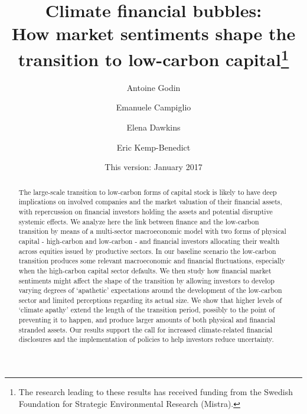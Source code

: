 \documentclass[authoryear]{article}
\begin{document}
 

\title{Climate financial bubbles: \\How market sentiments shape the transition to low-carbon capital\footnote{The research leading to these results has received funding from the Swedish Foundation for Strategic Environmental Research (Mistra).}}
\author[1]{Antoine Godin}
\author[2]{Emanuele Campiglio}
\author[3]{Elena Dawkins}
\author[3]{Eric Kemp-Benedict}
\renewcommand\Authands{ and }

\date{This version: January 2017}

\maketitle

\vspace{-0.7cm}
\begin{abstract}
The large-scale transition to low-carbon forms of capital stock is likely to have deep implications on involved companies and the market valuation of their financial assets, with repercussion on financial investors holding the assets and potential disruptive systemic effects. We analyze here the link between finance and the low-carbon transition by means of a multi-sector macroeconomic model with two forms of physical capital - high-carbon and low-carbon - and financial investors allocating their wealth across equities issued by productive sectors. In our baseline scenario the low-carbon transition produces some relevant macroeconomic and financial fluctuations, especially when the high-carbon capital sector defaults. We then study how financial market sentiments might affect the shape of the transition by allowing investors to develop varying degrees of `apathetic' expectations around the development of the low-carbon sector and limited perceptions regarding its actual size. We show that higher levels of `climate apathy' extend the length of the transition period, possibly to the point of preventing it to happen, and produce larger amounts of both physical and financial stranded assets. Our results support the call for increased climate-related financial disclosures and the implementation of policies to help investors reduce uncertainty.

\end{abstract}
\end{document}
